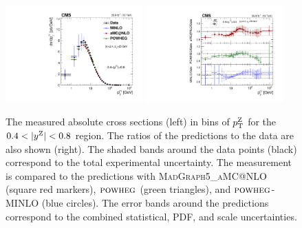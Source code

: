 \begin{figure}
	\centering
	\includegraphics[width=0.47\textwidth]{figures/zpt/zll_double_rap1.pdf}
        \includegraphics[width=0.47\textwidth]{figures/zpt/zll_double_ratio_rap1.pdf}
	\caption{The measured absolute cross sections (left) in bins of $p_{\mathrm{T}}^{\mathrm{Z}}$ for the $0.4 < |y^{\mathrm{Z}}| < 0.8$ region. The ratios of the predictions to the data are also shown (right). The shaded bands around the data points (black) correspond to the total experimental uncertainty. The measurement is compared to the predictions with \textsc{MadGraph5\_aMC@NLO} (square red markers),  ${\textsc{powheg}}$ (green triangles), and ${\textsc{powheg}}$-\textsc{MINLO} (blue circles). The error bands around the predictions correspond to the combined statistical, PDF, and scale uncertainties.}
	\label{fig:zll_double1}
\end{figure}

